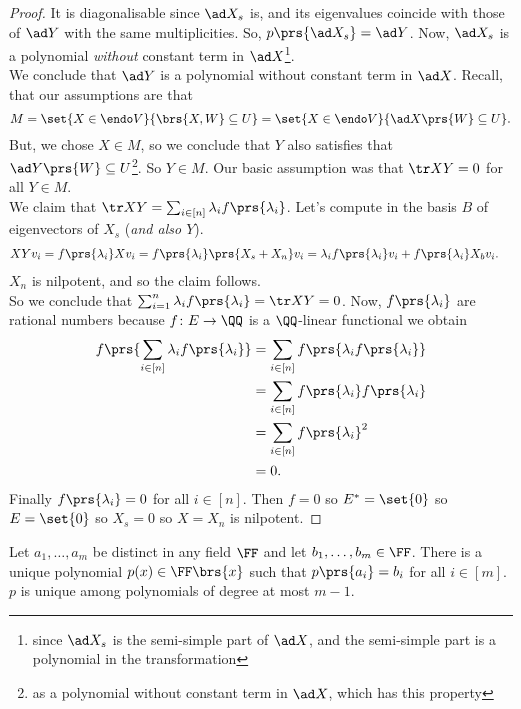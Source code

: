 \documentclass[10pt,a4paper,twoside,openany,hidelinks]{book}
\begin{document}
\begin{proof}
It is diagonalisable since $\ad X_s$ is, and its eigenvalues coincide with those of $\ad Y$ with the same multiplicities.
So, $p\prs{\ad X_s} = \ad Y$.
Now, $\ad X_s$ is a polynomial \emph{without} constant term in $\ad X$\footnote{since $\ad X_s$ is the semi-simple part of $\ad X$, and the semi-simple part is a polynomial in the transformation}.\\
We conclude that $\ad Y$ is a polynomial without constant term in $\ad X$. Recall, that our assumptions are that \[M = \set{X \in \endo V}{\brs{X,W} \subseteq U} = \set{X \in \endo V}{\ad X\prs{W} \subseteq U}\text{.}\]
But, we chose $X \in M$, so we conclude that $Y$ also satisfies that $\ad Y \prs{W} \subseteq U$\footnote{as a polynomial without constant term in $\ad X$, which has this property}. So $Y \in M$.
Our basic assumption was that $\tr XY = 0$ for all $Y \in M$.\\
We claim that $\tr XY = \sum_{i \in [n]} \lambda_i f\prs{\lambda_i}$. Let's compute in the basis $B$ of eigenvectors of $X_s$ (\emph{and also $Y$}).
\begin{align*}
XYv_i &= f\prs{\lambda_i} Xv_i = f\prs{\lambda_i} \prs{X_s + X_n}v_i = \lambda_i f\prs{\lambda_i}v_i + f\prs{\lambda_i} X_b v_i\text{.}
\end{align*}
$X_n$ is nilpotent, and so the claim follows.\\
So we conclude that $\sum_{i=1}^n \lambda_i f\prs{\lambda_i} = \tr XY = 0$.
Now, $f\prs{\lambda_i}$ are rational numbers because $f \colon E \to \QQ$ is a $\QQ$-linear functional we obtain
\begin{align*}
f\prs{\sum_{i\in[n]} \lambda_i f\prs{\lambda_i}} &= \sum_{i\in[n]} f\prs{\lambda_i f\prs{\lambda_i}} \\&= \sum_{i\in[n]} f\prs{\lambda_i}f\prs{\lambda_i} \\&= \sum_{i\in[n]} f\prs{\lambda_i}^2 \\&= 0\text{.}
\end{align*}
Finally $f\prs{\lambda_i} = 0$ for all $i \in [n]$. Then $f = 0$ so $E^* = \set{0}$ so $E = \set{0}$ so $X_s = 0$ so $X = X_n$ is nilpotent.
\end{proof}
\begin{theorem}
Let $a_1, \ldots, a_m$ be distinct in any field $\FF$ and let $b_1, \ldots, b_m \in \FF$. There is a unique polynomial $p(x) \in \FF\brs{x}$ such that $p\prs{a_i} = b_i$ for all $i \in [m]$. $p$ is unique among polynomials of degree at most $m-1$.
\end{theorem}
\end{document}
